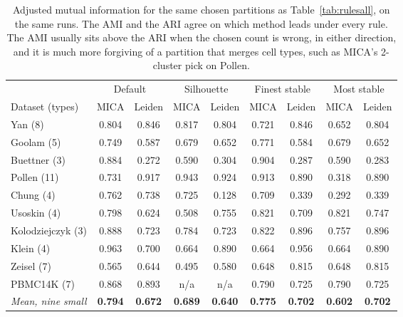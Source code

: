 \begin{table}[t]
\centering
\caption{Adjusted mutual information for the same chosen partitions as Table~\ref{tab:rulesall}, on the same runs. The AMI and the ARI agree on which method leads under every rule. The AMI usually sits above the ARI when the chosen count is wrong, in either direction, and it is much more forgiving of a partition that merges cell types, such as MICA's 2-cluster pick on Pollen.}
\label{tab:ami}
\footnotesize
\setlength{\tabcolsep}{4pt}
\begin{tabular}{lcccccccc}
\toprule
 & \multicolumn{2}{c}{Default} & \multicolumn{2}{c}{Silhouette} & \multicolumn{2}{c}{Finest stable} & \multicolumn{2}{c}{Most stable} \\
\cmidrule(lr){2-3}\cmidrule(lr){4-5}\cmidrule(lr){6-7}\cmidrule(lr){8-9}
Dataset (types) & MICA & Leiden & MICA & Leiden & MICA & Leiden & MICA & Leiden \\
\midrule
Yan (8) & 0.804 & 0.846 & 0.817 & 0.804 & 0.721 & 0.846 & 0.652 & 0.804 \\
Goolam (5) & 0.749 & 0.587 & 0.679 & 0.652 & 0.771 & 0.584 & 0.679 & 0.652 \\
Buettner (3) & 0.884 & 0.272 & 0.590 & 0.304 & 0.904 & 0.287 & 0.590 & 0.283 \\
Pollen (11) & 0.731 & 0.917 & 0.943 & 0.924 & 0.913 & 0.890 & 0.318 & 0.890 \\
Chung (4) & 0.762 & 0.738 & 0.725 & 0.128 & 0.709 & 0.339 & 0.292 & 0.339 \\
Usoskin (4) & 0.798 & 0.624 & 0.508 & 0.755 & 0.821 & 0.709 & 0.821 & 0.747 \\
Kolodziejczyk (3) & 0.888 & 0.723 & 0.784 & 0.723 & 0.822 & 0.896 & 0.757 & 0.896 \\
Klein (4) & 0.963 & 0.700 & 0.664 & 0.890 & 0.664 & 0.956 & 0.664 & 0.890 \\
Zeisel (7) & 0.565 & 0.644 & 0.495 & 0.580 & 0.648 & 0.815 & 0.648 & 0.815 \\
PBMC14K (7) & 0.868 & 0.893 & n/a & n/a & 0.790 & 0.725 & 0.790 & 0.725 \\
\midrule
\textit{Mean, nine small} & \textbf{0.794} & \textbf{0.672} & \textbf{0.689} & \textbf{0.640} & \textbf{0.775} & \textbf{0.702} & \textbf{0.602} & \textbf{0.702} \\
\bottomrule
\end{tabular}
\end{table}
